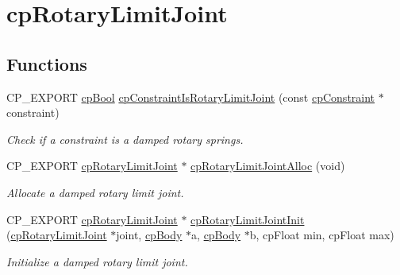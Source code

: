 \hypertarget{group__cpRotaryLimitJoint}{}\section{cp\+Rotary\+Limit\+Joint}
\label{group__cpRotaryLimitJoint}
\subsection*{Functions}
\begin{DoxyCompactItemize}
\item 
\mbox{\label{group__cpRotaryLimitJoint_ga676880ce66a491fe7576e4574825a403}} 
C\+P\+\_\+\+E\+X\+P\+O\+RT \hyperlink{group__basicTypes_gabc5e752c48f3449ca26ef413ecbd647e}{cp\+Bool} \hyperlink{group__cpRotaryLimitJoint_ga676880ce66a491fe7576e4574825a403}{cp\+Constraint\+Is\+Rotary\+Limit\+Joint} (const \hyperlink{structcpConstraint}{cp\+Constraint} $\ast$constraint)
\begin{DoxyCompactList}\small\item\em Check if a constraint is a damped rotary springs. \end{DoxyCompactList}\item 
\mbox{\label{group__cpRotaryLimitJoint_ga50b617996d2a1467c4fc2bd9f99f4834}} 
C\+P\+\_\+\+E\+X\+P\+O\+RT \hyperlink{structcpRotaryLimitJoint}{cp\+Rotary\+Limit\+Joint} $\ast$ \hyperlink{group__cpRotaryLimitJoint_ga50b617996d2a1467c4fc2bd9f99f4834}{cp\+Rotary\+Limit\+Joint\+Alloc} (void)
\begin{DoxyCompactList}\small\item\em Allocate a damped rotary limit joint. \end{DoxyCompactList}\item 
\mbox{\label{group__cpRotaryLimitJoint_ga12e929f35dbc204d38af5ff543f80903}} 
C\+P\+\_\+\+E\+X\+P\+O\+RT \hyperlink{structcpRotaryLimitJoint}{cp\+Rotary\+Limit\+Joint} $\ast$ \hyperlink{group__cpRotaryLimitJoint_ga12e929f35dbc204d38af5ff543f80903}{cp\+Rotary\+Limit\+Joint\+Init} (\hyperlink{structcpRotaryLimitJoint}{cp\+Rotary\+Limit\+Joint} $\ast$joint, \hyperlink{structcpBody}{cp\+Body} $\ast$a, \hyperlink{structcpBody}{cp\+Body} $\ast$b, cp\+Float min, cp\+Float max)
\begin{DoxyCompactList}\small\item\em Initialize a damped rotary limit joint. \end{DoxyCompactList}\item 

\end{DoxyCompactItemize}
